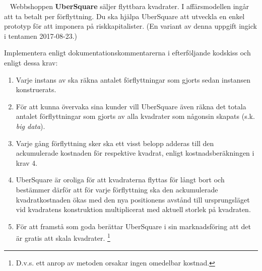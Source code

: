 \Task  \what~  Webbshoppen \textbf{UberSquare} säljer flyttbara kvadrater. I affärsmodellen ingår att ta betalt per förflyttning. Du ska hjälpa UberSquare att utveckla en enkel prototyp för att imponera på riskkapitalister. (En variant av denna uppgift ingick i tentamen 2017-08-23.)

\Subtask Implementera  enligt dokumentationskommentarerna i efterföljande kodskiss och enligt dessa krav:

\begin{enumerate}%
   \item Varje instans av  ska räkna antalet förflyttningar som gjorts sedan instansen konstruerats.

   \item För att kunna övervaka sina kunder vill UberSquare även räkna det totala antalet förflyttningar som gjorts av alla kvadrater som någonsin skapats (s.k. \emph{big data}).

  \item Varje gång förflyttning sker ska ett visst belopp adderas till den ackumulerade kostnaden för respektive kvadrat, enligt kostnadsberäkningen i krav 4.

  \item UberSquare är oroliga för att kvadraterna flyttas för långt bort och bestämmer därför att för varje förflyttning ska den ackumulerade kvadratkostnaden ökas med den nya positionens avstånd till ursprungsläget vid kvadratens konstruktion multiplicerat med aktuell storlek på kvadraten.

  \item För att framstå som goda berättar UberSquare i sin marknadsföring att det är gratis att skala kvadrater. \footnote{D.v.s. ett anrop av metoden  orsakar ingen omedelbar kostnad.}
\end{enumerate}

